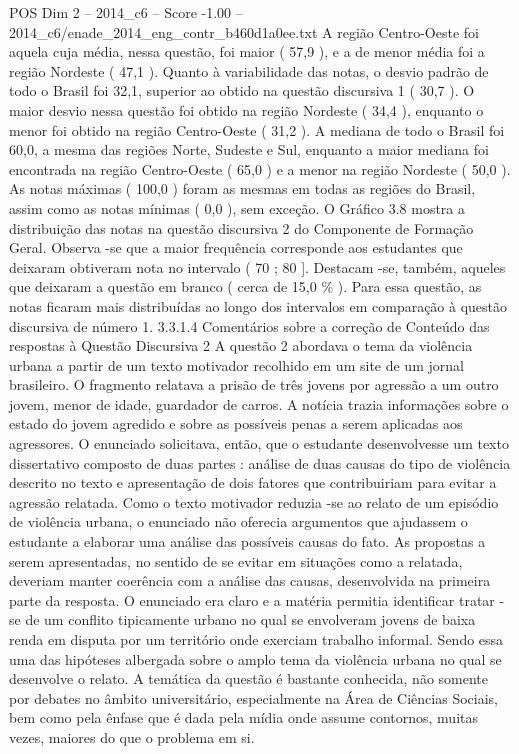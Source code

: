 \begin{textsample}{POS Dim 2 – 2014\_c6 – Score -1.00 – 2014\_c6/enade\_2014\_eng\_contr\_b460d1a0ee.txt}
A região Centro-Oeste foi aquela cuja média, nessa questão, foi maior ( 57,9 ), e a de menor média foi a região Nordeste ( 47,1 ).
Quanto à variabilidade das notas, o desvio padrão de todo o Brasil foi 32,1, superior ao obtido na questão discursiva 1 ( 30,7 ).
O maior desvio nessa questão foi obtido na região Nordeste ( 34,4 ), enquanto o menor foi obtido na região Centro-Oeste ( 31,2 ).
A mediana de todo o Brasil foi 60,0, a mesma das regiões Norte, Sudeste e Sul, enquanto a maior mediana foi encontrada na região Centro-Oeste ( 65,0 ) e a menor na região Nordeste ( 50,0 ).
As notas máximas ( 100,0 ) foram as mesmas em todas as regiões do Brasil, assim como as notas mínimas ( 0,0 ), sem exceção.
O Gráfico 3.8 mostra a distribuição das notas na questão discursiva 2 do Componente de Formação Geral.
Observa -se que a maior frequência corresponde aos estudantes que deixaram obtiveram nota no intervalo ( 70 ; 80 ].
Destacam -se, também, aqueles que deixaram a questão em branco ( cerca de 15,0 \% ).
Para essa questão, as notas ficaram mais distribuídas ao longo dos intervalos em comparação à questão discursiva de número 1. 3.3.1.4 Comentários sobre a correção de Conteúdo das respostas à Questão Discursiva 2 A questão 2 abordava o tema da violência urbana a partir de um texto motivador recolhido em um site de um jornal brasileiro.
O fragmento relatava a prisão de três jovens por agressão a um outro jovem, menor de idade, guardador de carros.
A notícia trazia informações sobre o estado do jovem agredido e sobre as possíveis penas a serem aplicadas aos agressores.
O enunciado solicitava, então, que o estudante desenvolvesse um texto dissertativo composto de duas partes : análise de duas causas do tipo de violência descrito no texto e apresentação de dois fatores que contribuiriam para evitar a agressão relatada.
Como o texto motivador reduzia -se ao relato de um episódio de violência urbana, o enunciado não oferecia argumentos que ajudassem o estudante a elaborar uma análise das possíveis causas do fato.
As propostas a serem apresentadas, no sentido de se evitar em situações como a relatada, deveriam manter coerência com a análise das causas, desenvolvida na primeira parte da resposta.
O enunciado era claro e a matéria permitia identificar tratar -se de um conflito tipicamente urbano no qual se envolveram jovens de baixa renda em disputa por um território onde exerciam trabalho informal.
Sendo essa uma das hipóteses albergada sobre o amplo tema da violência urbana no qual se desenvolve o relato.
A temática da questão é bastante conhecida, não somente por debates no âmbito universitário, especialmente na Área de Ciências Sociais, bem como pela ênfase que é dada pela mídia onde assume contornos, muitas vezes, maiores do que o problema em si.

\end{textsample}
